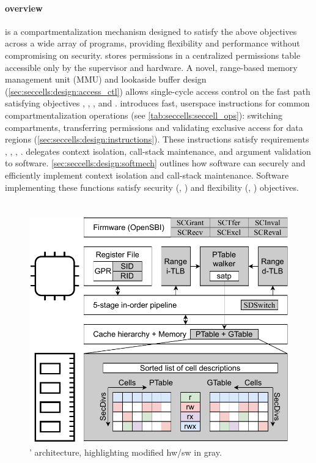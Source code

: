 \paragraph{\seccells overview}
\seccells is a compartmentalization mechanism designed
to satisfy the above objectives across a wide array of 
programs, providing flexibility and performance without compromising on 
security.
\seccells stores permissions in a centralized permissions table accessible 
only by the supervisor and hardware.
A novel, range-based memory management unit (MMU) and 
lookaside buffer design (\autoref{sec:seccells:design:access_ctl})
allows single-cycle access control on the fast path satisfying 
objectives , , , and .
\seccells introduces fast, userspace instructions for common 
compartmentalization operations (see \autoref{tab:seccells:seccell_ops}): 
switching compartments, transferring permissions and validating
exclusive access for data regions (\autoref{sec:seccells:design:instructions}).
These instructions satisfy requirements , ,
, .
\seccells delegates context isolation, call-stack maintenance,
and argument validation to software.
\autoref{sec:seccells:design:softmech} outlines how software can
securely and efficiently implement context isolation and call-stack 
maintenance.
Software implementing these functions satisfy security (, )
and flexibility (, ) objectives.

\section{\seccells}
\label{sec:seccells:design}

\begin{figure}
  \centering
  \includegraphics[width=0.85\linewidth]{media/seccells/seccell_arch.pdf}
  \caption[\seccells: Architecture.]
          {\seccells' architecture, highlighting modified hw/sw in gray.}
  \label{fig:seccells:seccell_arch}
\end{figure}


